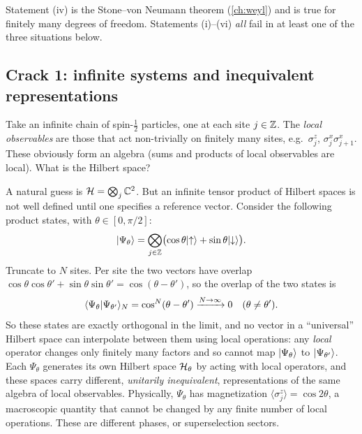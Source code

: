 Statement (iv) is the Stone--von Neumann theorem (\cref{ch:weyl}) and is true for finitely many degrees of freedom. Statements (i)--(vi) \emph{all} fail in at least one of the three situations below.

\subsection{Crack 1: infinite systems and inequivalent representations}

Take an infinite chain of spin-$\tfrac12$ particles, one at each site $j\in\mathbb{Z}$. The \emph{local observables} are those that act non-trivially on finitely many sites, e.g.\ $\sigma^z_j$, $\sigma^x_j\sigma^x_{j+1}$. These obviously form an algebra (sums and products of local observables are local). What is the Hilbert space?

A natural guess is $\mathcal{H}=\bigotimes_{j}\mathbb{C}^2$. But an infinite tensor product of Hilbert spaces is not well defined until one specifies a reference vector. Consider the following product states, with $\theta\in[0,\pi/2]$:
\begin{equation}
\lvert \Psi_\theta\rangle=\bigotimes_{j\in\mathbb{Z}}\bigl(\cos\theta\lvert \uparrow\rangle+\sin\theta\lvert \downarrow\rangle\bigr).
\end{equation}
Truncate to $N$ sites. Per site the two vectors have overlap $\cos\theta\cos\theta'+\sin\theta\sin\theta'=\cos(\theta-\theta')$, so the overlap of the two states is
\begin{equation}
\langle \Psi_\theta\vert \Psi_{\theta'}\rangle_N=\cos^N(\theta-\theta')\xrightarrow{N\to\infty}0\quad(\theta\ne\theta').
\end{equation}
So these states are exactly orthogonal in the limit, and no vector in a ``universal'' Hilbert space can interpolate between them using local operations: any \emph{local} operator changes only finitely many factors and so cannot map $\lvert \Psi_\theta\rangle$ to $\lvert \Psi_{\theta'}\rangle$. Each $\Psi_\theta$ generates its own Hilbert space $\mathcal{H}_\theta$ by acting with local operators, and these spaces carry different, \emph{unitarily inequivalent}, representations of the same algebra of local observables. Physically, $\Psi_\theta$ has magnetization $\langle\sigma^z_j\rangle=\cos 2\theta$, a macroscopic quantity that cannot be changed by any finite number of local operations. These are different phases, or superselection sectors.

